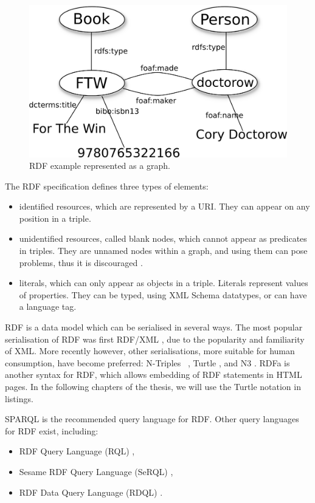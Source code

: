 \begin{figure}[th]
 \includegraphics[width=0.8\linewidth]{chapters/background/img/rdfex}
\caption{RDF example represented as a graph.}
\label{fig:rdfex}
\end{figure} 

The RDF specification defines three types of elements: 
\begin{itemize}
 \item identified resources, which are represented by a URI. They can appear on any position in a triple.
 \item unidentified resources, called blank nodes, which cannot appear as predicates in triples. They are unnamed nodes within a graph, and using them can pose problems, thus it is discouraged \cite{Bizer2007}.
 \item literals, which can only appear as objects in a triple. Literals represent values of properties. They can be typed, using XML Schema datatypes, or can have a language tag.
\end{itemize}

RDF is a data model which can be serialised in several ways. The most popular serialisation of RDF was first RDF/XML \cite{Beckett2004}, due to the popularity and familiarity of XML. More recently however, other serialisations, more suitable for human consumption, have become preferred: N-Triples ~\cite{Grant2004}, Turtle \cite{Beckett2007}, and N3 \cite{BernersLee2006b}. RDFa \cite{Adida2008} is another syntax for RDF, which allows embedding of RDF statements in HTML pages. In the following chapters of the thesis, we will use the Turtle notation in listings.

SPARQL \cite{Prudhommeaux2008} is the recommended query language for RDF. Other query languages for RDF exist, including: 
\begin{itemize}
 \item RDF Query Language (RQL) \cite{Karvounarakis2002}, 
 \item Sesame RDF Query Language (SeRQL) \cite{Broekstra2003}, 
 \item RDF Data Query Language (RDQL) \cite{Seaborne2004}.
\end{itemize}

